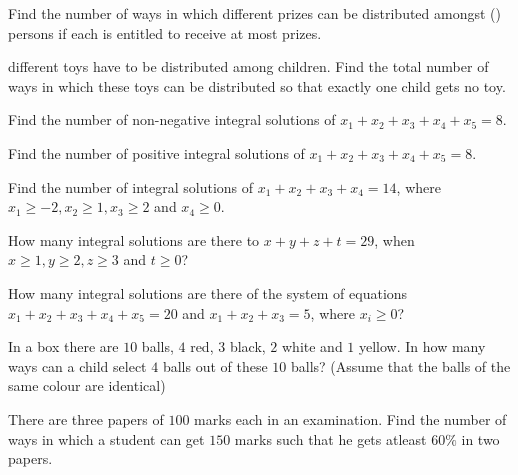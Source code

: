 \item Find the number of ways in which  different prizes can be distributed amongst  ()
  persons if each is entitled to receive at most  prizes.
\item {} different toys have to be distributed among  children. Find the total number of ways in
  which these toys can be distributed so that exactly one child gets no toy.
\item Find the number of non-negative integral solutions of $x_1 + x_2 + x_3 + x_4 + x_5 = 8$.
\item Find the number of positive integral solutions of $x_1 + x_2 + x_3 + x_4 + x_5 = 8$.
\item Find the number of integral solutions of $x_1 + x_2 + x_3 + x_4 = 14$, where $x_1\geq -2, x_2\geq 1,
  x_3\geq 2$ and $x_4\geq 0$.
\item How many integral solutions are there to $x + y + z + t = 29$, when $x\geq 1, y\geq 2, z\geq 3$
  and $t\geq 0$?
\item How many integral solutions are there of the system of equations $x_1 + x_2 + x_3 + x_4 + x_5 = 20$
  and $x_1 + x_2 + x_3 = 5$, where $x_i\geq 0$?
\item In a box there are $10$ balls, $4$ red, $3$ black, $2$ white and $1$ yellow. In how many ways can a
  child select $4$ balls out of these $10$ balls? (Assume that the balls of the same colour are identical)
\item There are three papers of $100$ marks each in an examination. Find the number of ways in which a
  student can get $150$ marks such that he gets atleast $60\%$ in two papers.
\stopitemize
